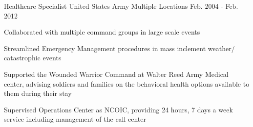 \begin{cventries}
 \cventry
    {Healthcare Specialist} %
    {United States Army} %
    {Multiple Locations} %
    {Feb. 2004 - Feb. 2012} %
    {
      \begin{cvitems} %
        \item {Collaborated with multiple command groups in large scale events}
        \item {Streamlined Emergency Management procedures in mass inclement weather/ catastrophic events}
        \item {Supported the Wounded Warrior Command at Walter Reed Army Medical center, advising soldiers and families on the behavioral health options available to them during their stay}
        \item {Supervised Operations Center as NCOIC, providing 24 hours, 7 days a week service including management of the call center}
      \end{cvitems}
    }
    
\end{cventries}
